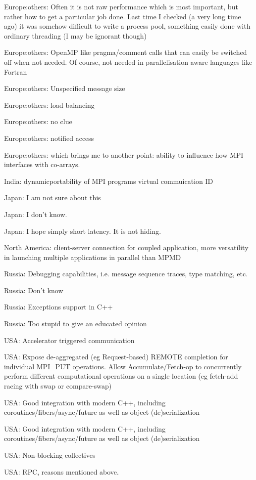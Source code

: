 \item Europe:others: Often it is not raw performance which is most important, but rather how to get a particular job done.  Last time I checked (a very long time ago) it was somehow difficult to write a process pool, something easily done with ordinary threading (I may be ignorant though)
\item Europe:others: OpenMP like pragma/comment calls that can easily be switched off when not needed. Of course, not needed in parallelisation aware languages like Fortran
\item Europe:others: Unspecified message size
\item Europe:others: load balancing
\item Europe:others: no clue
\item Europe:others: notified access
\item Europe:others: which brings me to another point: ability to influence how MPI interfaces with co-arrays.
\item India: dynamicportability of MPI programs virtual commuication ID
\item Japan: I am not sure about this
\item Japan: I don't know.
\item Japan: I hope simply short latency.  It is not hiding.
\item North America: client-server connection for coupled application, more versatility in launching multiple applications in parallel than MPMD
\item Russia: Debugging capabilities, i.e. message sequence traces, type matching, etc.
\item Russia: Don't know
\item Russia: Exceptions support in C++
\item Russia: Too stupid to give an educated opinion
\item USA: Accelerator triggered communication
\item USA: Expose de-aggregated (eg Request-based) REMOTE completion for individual MPI\_PUT operations. Allow Accumulate/Fetch-op to concurrently perform different computational operations on a single location (eg fetch-add racing with swap or compare-swap)
\item USA: Good integration with modern C++, including coroutines/fibers/async/future as well as object (de)serialization
\item USA: Good integration with modern C++, including coroutines/fibers/async/future as well as object (de)serialization
\item USA: Non-blocking collectives
\item USA: RPC, reasons mentioned above.
